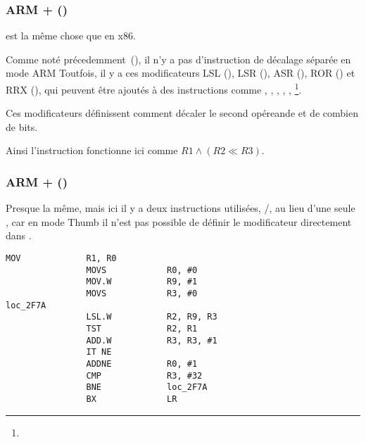 \subsubsection{ARM + \OptimizingXcodeIV (\ARMMode)}



\TST est la même chose que \TEST en x86.

Comme noté précedemment~(), il n'y a pas d'instruction
de décalage séparée en mode ARM
Toutfois, il y a ces modificateurs
LSL (), 
LSR (), 
ASR (), 
ROR () et
RRX (),
qui peuvent être ajoutés à des instructions comme \MOV, \TST,
\CMP, \ADD, \SUB, \RSB\footnote{\DataProcessingInstructionsFootNote}.

Ces modificateurs définissent comment décaler le second opéreande et de combien de
bits.

Ainsi l'instruction  fonctionne ici comme $R1 \land (R2
\ll R3)$.

\subsubsection{ARM + \OptimizingXcodeIV (\ThumbTwoMode)}

Presque la même, mais ici il y a deux instructions utilisées, /\TST, au
lieu d'une seule \TST, car en mode Thumb il n'est pas possible de définir le modificateur
\LSL directement dans \TST.

\begin{lstlisting}[label=ARM_leaf_example5,style=customasmARM]
                MOV             R1, R0
                MOVS            R0, #0
                MOV.W           R9, #1
                MOVS            R3, #0
loc_2F7A
                LSL.W           R2, R9, R3
                TST             R2, R1
                ADD.W           R3, R3, #1
                IT NE
                ADDNE           R0, #1
                CMP             R3, #32
                BNE             loc_2F7A
                BX              LR
\end{lstlisting}

